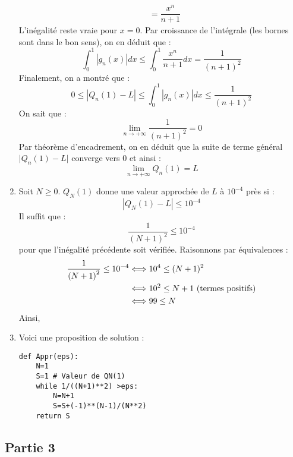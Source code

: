 \documentclass[a4paper,twoside,french,10pt]{VcCours}
\begin{document}
\begin{enumerate}
\begin{align*}
& =\dfrac{x^{n}}{n+1}
\end{align*} 
L'inégalité reste vraie pour $x=0$. Par croissance de l'intégrale (les bornes sont dans le bon sens), on en déduit que :
\[
\int_{0}^{1}\left\vert g_{n}\left(  x\right)  \right\vert dx\leq\int_{0}%
^{1}\dfrac{x^{n}}{n+1}dx=\dfrac{1}{\left(  n+1\right)  ^{2}}%
\]
Finalement, on a montré que :
\[
\boxed{0 \leq \left\vert Q_{n}\left(  1\right)  -L\right\vert \leq\int_{0}^{1}\left\vert
g_{n}\left(  x\right)  \right\vert dx\leq\dfrac{1}{\left(  n+1\right)  ^{2}}}
\]
On sait que :
$$ \lim_{n \rightarrow + \infty} \dfrac{1}{(n+1)^2} = 0$$
Par théorème d'encadrement, on en déduit que la suite de terme général $\vert Q_{n}\left(  1\right)  -L\vert$ converge vers $0$ et ainsi :
$$\boxed{\lim\limits_{n\rightarrow+\infty}Q_{n}\left(  1\right) = L}$$
\item Soit $N \geq 0$. $Q_{N}\left(  1\right) $ donne une valeur approchée de $L$ \`a $10^{-4}$ près si :
$$\left\vert Q_{N}\left(  1\right)  -L\right\vert \leq10^{-4}$$
Il suffit que :
$$\dfrac{1}{\left(  N+1\right)  ^{2}}\leq10^{-4}$$
pour que l'inégalité précédente soit vérifiée. Raisonnons par équivalences :
\begin{align*}
\dfrac{1}{\left(  N+1\right)  ^{2}}\leq10^{-4} & \Longleftrightarrow 10^4 \leq (N+1)^2 \\
& \Longleftrightarrow 10^2 \leq N+1 \hbox{ (termes positifs)} \\
& \Longleftrightarrow 99 \leq N
\end{align*}
Ainsi,
\item Voici une proposition de solution :
\begin{lstlisting}
def Appr(eps):
    N=1
    S=1 # Valeur de QN(1)
    while 1/((N+1)**2) >eps:
        N=N+1
        S=S+(-1)**(N-1)/(N**2)
    return S
\end{lstlisting}
\end{enumerate}

\subsection*{Partie 3}
\end{document}
